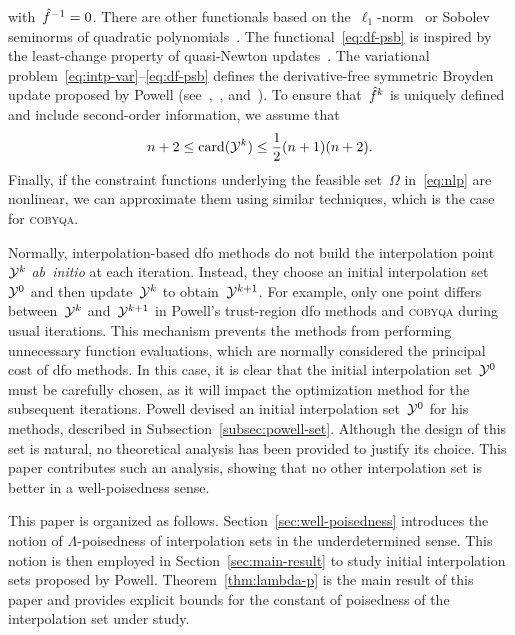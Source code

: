 \documentclass[draft]{article}
\numberwithin{equation}{section}
\theoremstyle{definition}
\theoremstyle{plain}
\theoremstyle{remark}
\DeclareMathOperator{\card}{card}
\newcommand*{\fset}{\Omega}
\newcommand*{\obj}{f}
\newcommand*{\objm}[1][]{\hat{\obj}\ifblank{#1}{}{^{#1}}}
\newcommand*{\solvername}[1]{\textsc{#1}\xspace}
\newcommand*{\xpt}[1][]{\mathcal{Y}\ifblank{#1}{}{^{#1}}}
\begin{document}
with~$\objm[-1] = 0$.
There are other functionals based on the~$\ell_1$-norm~\cite{Bandeira_Scheinberg_Vicente_2012} or Sobolev seminorms of quadratic polynomials~\cite{Zhang_2014,Xie_Yuan_2022}.
The functional~\eqref{eq:df-psb} is inspired by the least-change property of quasi-Newton updates~\cite{Dennis_Schnabel_1979}.
The variational problem~\eqref{eq:intp-var}--\eqref{eq:df-psb} defines the derivative-free symmetric
Broyden update proposed by Powell (see~\cite{Powell_2004a,Powell_2013},~\cite[\S~3.6]{Zhang_2012}, and~\cite[\S~2.4.2]{Ragonneau_2022}).
To ensure that~$\objm[k]$ is uniquely defined and include second-order information, we assume that
\begin{equation*}
    n + 2 \le \card(\xpt[k]) \le \frac{1}{2} (n + 1) (n + 2).
\end{equation*}
Finally, if the constraint functions underlying the feasible set~$\fset$ in~\eqref{eq:nlp} are nonlinear, we can approximate them using similar techniques, which is the case for \solvername{cobyqa}.

Normally, interpolation-based \gls{dfo} methods do not build the interpolation point~$\xpt[k]$ \emph{ab~initio} at each iteration.
Instead, they choose an initial interpolation set~$\xpt[0]$ and then  update~$\xpt[k]$ to obtain~$\xpt[k + 1]$.
For example, only one point differs between~$\xpt[k]$ and~$\xpt[k + 1]$ in Powell's trust-region \gls{dfo} methods and \solvername{cobyqa} during usual iterations.
This mechanism prevents the methods from performing unnecessary function evaluations, which are normally considered the principal cost of \gls{dfo} methods.
In this case, it is clear that the initial interpolation set~$\xpt[0]$ must be carefully chosen, as it will impact the optimization method for the subsequent iterations.
Powell devised an initial interpolation set~$\xpt[0]$ for his methods, described in Subsection~\ref{subsec:powell-set}.
Although the design of this set is natural, no theoretical analysis has been provided to justify its choice.
This paper contributes such an analysis, showing that no other interpolation set is better in a well-poisedness sense.

This paper is organized as follows.
Section~\ref{sec:well-poisedness} introduces the notion of $\Lambda$-poisedness of interpolation sets in the underdetermined sense.
This notion is then employed in Section~\ref{sec:main-result} to study initial interpolation sets proposed by Powell.
Theorem~\ref{thm:lambda-p} is the main result of this paper and provides explicit bounds for the constant of poisedness of the interpolation set under study.
\end{document}
